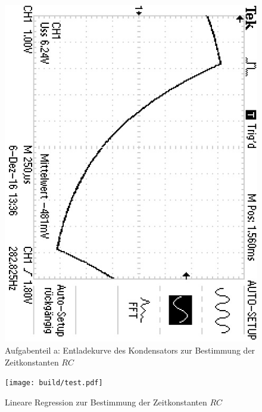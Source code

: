\begin{figure}
	\centering
	\includegraphics[angle=90]{bilder/F0000TEK.JPG}
	\caption{Aufgabenteil a: Entladekurve des Kondensators zur Bestimmung der Zeitkonstanten $RC$}
	\label{fig:plotrc}
\end{figure}

\begin{figure}
	\centering
	\texttt{[image: build/test.pdf]}
	\caption{Lineare Regression zur Bestimmung der Zeitkonstanten $RC$}
	\label{fig:plota}
\end{figure}


